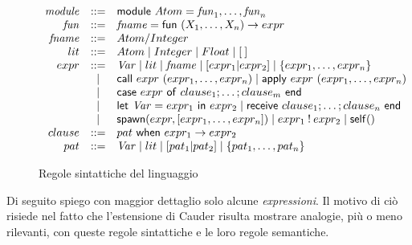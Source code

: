 \documentclass[background.tex]{subfiles}
\begin{document}
\begin{figure}[!ht]
  $\displaystyle
  \begin{array}{rcl@{~~~~~~}l}
    \mathit{module} & ::= & \mathsf{module} ~ Atom = %
    \mathit{fun}_1,\ldots,\mathit{fun}_n\\
    {\mathit{fun}} & ::= & \mathit{fname} = \mathsf{fun}~(X_1,\ldots,X_n) \to expr \\
    {\mathit{fname}} & ::= & Atom/Integer \\
    lit & ::= & Atom \mid Integer \mid Float \mid \nil \\
    expr & ::= & \mathit{Var} \mid lit \mid \mathit{fname} \mid [expr_1|expr_2]
                 \mid   \{expr_1,\ldots,expr_n\} \\
    & \mid & \mathsf{call}~expr~(expr_1,\ldots,expr_n) 
    \mid \mathsf{apply}~expr~(expr_1,\ldots,expr_n) \\
    & \mid &
    \mathsf{case}~expr~\mathsf{of}~clause_1;\ldots;clause_m~\mathsf{end}\\
    & \mid & \mathsf{let}~\mathit{Var}=expr_1~\mathsf{in}~expr_2 
    \mid \mathsf{receive}~clause_1;\ldots;clause_n~\mathsf{end}\\
    & \mid & \mathsf{spawn}(expr,[expr_1,\ldots,expr_n])  
     \mid expr_1 \:!\: expr_2 \mid \mathsf{self}()\\
    clause & ::= & pat ~\mathsf{when}~expr_1 \to expr_2
    \\
    pat & ::= & \mathit{Var} \mid lit \mid [pat_1|pat_2] \mid
    \{pat_1,\ldots,pat_n\} \\
  \end{array}
  $
\caption{Regole sintattiche del linguaggio} 
\label{fig2}
\end{figure}
Di seguito spiego con maggior dettaglio solo alcune \textit{expressioni}.
Il motivo di ciò risiede nel fatto che l'estensione di Cauder risulta mostrare analogie, più o meno rilevanti, con queste regole sintattiche e le loro regole semantiche.\\
\end{document}
